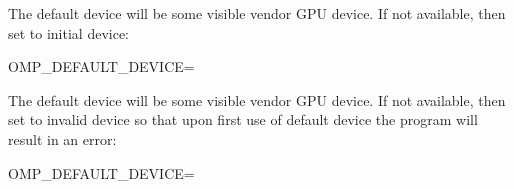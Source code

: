 The default device will be some visible vendor  GPU device. 
If not available, then set to initial device:
\begin{boxedcode}
OMP_DEFAULT_DEVICE=
\end{boxedcode}

The default device will be some visible vendor  GPU device. 
If not available, then set to invalid device so that upon first use of default 
device the program will result in an error:
\begin{boxedcode}
OMP_DEFAULT_DEVICE=
\end{boxedcode}

